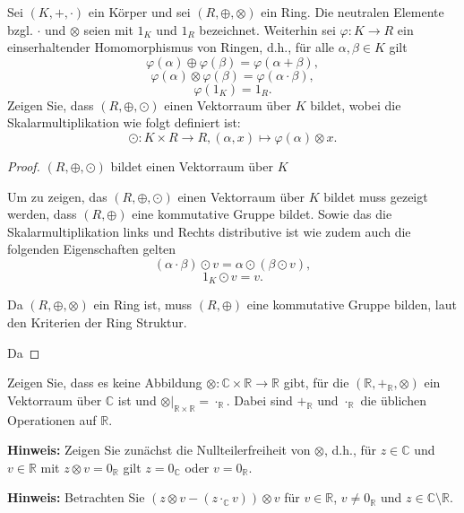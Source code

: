 \documentclass{../problemset}
\author{Michael van Straten}
\begin{document}
\maketitle

\begin{problem}
Sei $(K, +, \cdot)$ ein Körper und sei $(R, \oplus, \otimes)$ ein Ring. 
Die neutralen Elemente bzgl. $\cdot$ und $\otimes$ seien mit $1_K$ und $1_R$ bezeichnet. 
Weiterhin sei $\varphi: K \to R$ ein einserhaltender Homomorphismus von Ringen, d.h., für alle $\alpha, \beta \in K$ gilt
\[
	\varphi(\alpha) \oplus \varphi(\beta) = \varphi(\alpha + \beta),
\]
\[
	\varphi(\alpha) \otimes \varphi(\beta) = \varphi(\alpha \cdot \beta),
\]
\[
	\varphi(1_K) = 1_R.
\]
Zeigen Sie, dass $(R, \oplus, \odot)$ einen Vektorraum über $K$ bildet, wobei die Skalarmultiplikation wie folgt definiert ist:
\[
	\odot: K \times R \to R, (\alpha, x) \mapsto \varphi(\alpha) \otimes x.
\]
\begin{proof}
	$(R, \oplus, \odot)$ bildet einen Vektorraum über $K$

	Um zu zeigen, das $(R, \oplus, \odot)$ einen Vektorraum über $K$ bildet muss gezeigt werden, dass
	$(R, \oplus)$ eine kommutative Gruppe bildet.
	Sowie das die Skalarmultiplikation links und Rechts distributive ist wie zudem auch die folgenden Eigenschaften gelten
	\[
        (\alpha \cdot \beta) \odot v = \alpha \odot (\beta \odot v),
	\]
    \[
        1_K \odot v = v.
    \]

    Da $(R, \oplus, \otimes)$ ein Ring ist, muss $(R, \oplus)$ eine kommutative Gruppe bilden, laut den Kriterien der Ring Struktur. 

    Da 
\end{proof}
\end{problem}

\pagebreak

\begin{problem}
Zeigen Sie, dass es keine Abbildung $\otimes: \mathbb{C} \times \mathbb{R} \to \mathbb{R}$ gibt, für die $(\mathbb{R}, +_{\mathbb{R}}, \otimes)$ ein Vektorraum über $\mathbb{C}$ ist und $\otimes|_{\mathbb{R} \times \mathbb{R}} = \cdot_{\mathbb{R}}$. Dabei sind $+_{\mathbb{R}}$ und $\cdot_{\mathbb{R}}$ die üblichen Operationen auf $\mathbb{R}$.

\textbf{Hinweis:} Zeigen Sie zunächst die Nullteilerfreiheit von $\otimes$, d.h., für $z \in \mathbb{C}$ und $v \in \mathbb{R}$ mit $z \otimes v = 0_{\mathbb{R}}$ gilt $z = 0_{\mathbb{C}}$ oder $v = 0_{\mathbb{R}}$.

\textbf{Hinweis:} Betrachten Sie $(z \otimes v - (z \cdot_{\mathbb{C}} v)) \otimes v$ für $v \in \mathbb{R}$, $v \neq 0_{\mathbb{R}}$ und $z \in \mathbb{C} \setminus \mathbb{R}$.
\end{problem}
\end{document}
